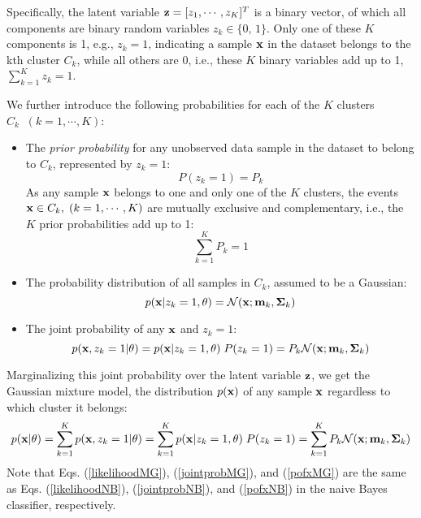 \documentclass{article}
\begin{document}
Specifically, the latent variable ${\bf z}=[z_1,\cdots,z_K]^T$ is a
binary vector, of which all components are binary random variables 
$z_k\in\{0,\,1\}$. Only one of these $K$ components is 1, e.g., 
$z_k=1$, indicating a sample ${\bf x}$ in the dataset belongs to 
the kth cluster $C_k$, while all others are 0, i.e., these $K$ 
binary variables add up to 1, $\sum_{k=1}^K z_k=1$. 

We further introduce the following probabilities for each of the
$K$ clusters $C_k\;\;(k=1,\cdots,K)$:
\begin{itemize}
\item The {\em prior probability} for any unobserved data sample 
  in the dataset to belong to $C_k$, represented by $z_k=1$:
  \begin{equation}
    P(z_k=1)=P_k
  \end{equation}
  As any sample ${\bf x}$ belongs to one and only one of the $K$ 
  clusters, the events ${\bf x}\in C_k,\;(k=1,\cdots,K)$ are mutually
  exclusive and complementary, i.e., the $K$ prior probabilities add
  up to 1:
  \begin{equation}
    \sum_{k=1}^K P_k =1
  \end{equation}
\item The probability distribution of all samples in $C_k$, assumed 
  to be a Gaussian:
  \begin{equation}
    p({\bf x}|z_k=1,\theta)={\cal N}({\bf x};{\bf m}_k,{\bf\Sigma}_k)
    \label{likelihoodMG}
  \end{equation}

\item The joint probability of any ${\bf x}$ and $z_k=1$:
  \begin{equation}
    p({\bf x},z_k=1|\theta)=p({\bf x}|z_k=1,\theta)\;P(z_k=1)
    =P_k {\cal N}({\bf x};{\bf m}_k,{\bf\Sigma}_k)
    \label{jointprobMG}
  \end{equation}
\end{itemize}
Marginalizing this joint probability over the latent variable 
${\bf z}$, we get the Gaussian mixture model, the distribution 
$p({\bf x})$ of any sample ${\bf x}$ regardless to which cluster 
it belongs:
\begin{equation}
  p({\bf x}|\theta)=\sum_{k=1}^K p({\bf x},z_k=1|\theta)
  =\sum_{k=1}^K p({\bf x}|z_k=1,\theta)\;P(z_k=1)
  =\sum_{k=1}^K P_k {\cal N}({\bf x}; {\bf m}_k,{\bf\Sigma}_k)
  \label{pofxMG}
\end{equation}
Note that Eqs. (\ref{likelihoodMG}), (\ref{jointprobMG}), and
(\ref{pofxMG}) are the same as Eqs. (\ref{likelihoodNB}),
(\ref{jointprobNB}), and (\ref{pofxNB}) in the naive Bayes 
classifier, respectively.
\end{document}
